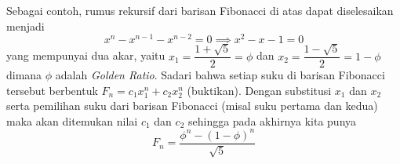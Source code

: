 Sebagai contoh, rumus rekursif dari barisan Fibonacci di atas dapat diselesaikan menjadi 
$$x^{n}-x^{n-1}-x^{n-2}=0 \implies x^2-x-1=0$$
yang mempunyai dua akar, yaitu $x_1 = \dfrac{1+\sqrt{5}}{2}=\phi$ dan $x_2 = \dfrac{1-\sqrt{5}}{2}=1-\phi$ dimana $\phi$ adalah \textit{Golden Ratio}. Sadari bahwa setiap suku di barisan Fibonacci tersebut berbentuk $F_n = c_1x_1^n + c_2x_2^n$ (buktikan). Dengan substitusi $x_1$ dan $x_2$ serta pemilihan suku dari barisan Fibonacci (misal suku pertama dan kedua) maka akan ditemukan nilai $c_1$ dan $c_2$ sehingga pada akhirnya kita punya
$$F_n=\dfrac{\phi^n-(1-\phi)^n}{\sqrt{5}}$$

